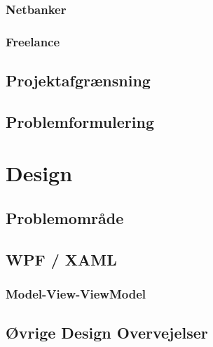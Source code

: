 \subsection{Netbanker}

\subsection{Freelance}


\section{Projektafgrænsning}


\section{Problemformulering}


%

\chapter{Design}

\section{Problemområde}


\section{WPF / XAML}

\subsection{Model-View-ViewModel}


\section{Øvrige Design Overvejelser}





